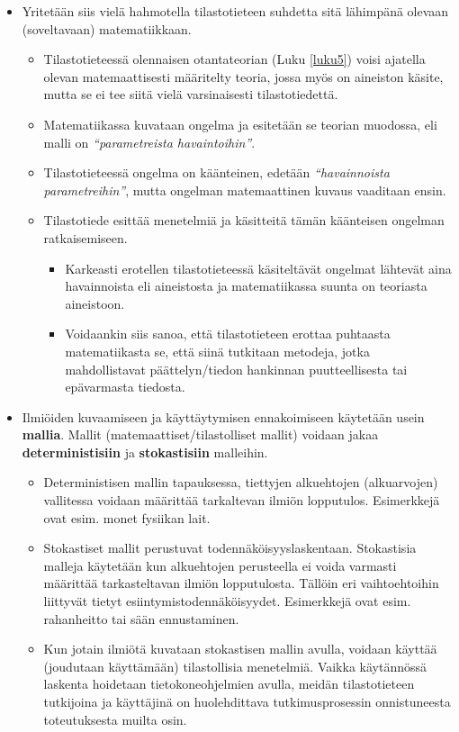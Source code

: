\documentclass[
]{book}
\providecommand{\tightlist}{%
  \setlength{\itemsep}{0pt}\setlength{\parskip}{0pt}}
\begin{document}
\begin{itemize}
\tightlist
\item
  Yritetään siis vielä hahmotella tilastotieteen suhdetta sitä lähimpänä olevaan (soveltavaan) matematiikkaan.

  \begin{itemize}
  \tightlist
  \item
    Tilastotieteessä olennaisen otantateorian (Luku \ref{luku5}) voisi ajatella olevan matemaattisesti määritelty teoria, jossa myös on aineiston käsite, mutta se ei tee siitä vielä varsinaisesti tilastotiedettä.
  \item
    Matematiikassa kuvataan ongelma ja esitetään se teorian muodossa, eli malli on \emph{``parametreista havaintoihin''}.
  \item
    Tilastotieteessä ongelma on käänteinen, edetään \emph{``havainnoista parametreihin''}, mutta ongelman matemaattinen kuvaus vaaditaan ensin.
  \item
    Tilastotiede esittää menetelmiä ja käsitteitä tämän käänteisen ongelman ratkaisemiseen.

    \begin{itemize}
    \tightlist
    \item
      Karkeasti erotellen tilastotieteessä käsiteltävät ongelmat lähtevät aina havainnoista eli aineistosta ja matematiikassa suunta on teoriasta aineistoon.
    \item
      Voidaankin siis sanoa, että tilastotieteen erottaa puhtaasta matematiikasta se, että siinä tutkitaan metodeja, jotka mahdollistavat päättelyn/tiedon hankinnan puutteellisesta tai epävarmasta tiedosta.
    \end{itemize}
  \end{itemize}
\item
  Ilmiöiden kuvaamiseen ja käyttäytymisen ennakoimiseen käytetään usein \textbf{mallia}. Mallit (matemaattiset/tilastolliset mallit) voidaan jakaa \textbf{deterministisiin} ja \textbf{stokastisiin} malleihin.

  \begin{itemize}
  \tightlist
  \item
    Deterministisen mallin tapauksessa, tiettyjen alkuehtojen (alkuarvojen) vallitessa voidaan määrittää tarkaltevan ilmiön lopputulos. Esimerkkejä ovat esim. monet fysiikan lait.
  \item
    Stokastiset mallit perustuvat todennäköisyyslaskentaan. Stokastisia malleja käytetään kun alkuehtojen perusteella ei voida varmasti määrittää tarkasteltavan ilmiön lopputulosta. Tällöin eri vaihtoehtoihin liittyvät tietyt esiintymistodennäköisyydet. Esimerkkejä ovat esim. rahanheitto tai sään ennustaminen.
  \item
    Kun jotain ilmiötä kuvataan stokastisen mallin avulla, voidaan käyttää (joudutaan käyttämään) tilastollisia menetelmiä. Vaikka käytännössä laskenta hoidetaan tietokoneohjelmien avulla, meidän tilastotieteen tutkijoina ja käyttäjinä on huolehdittava tutkimusprosessin onnistuneesta toteutuksesta muilta osin.
  \end{itemize}
\end{itemize}
\end{document}

